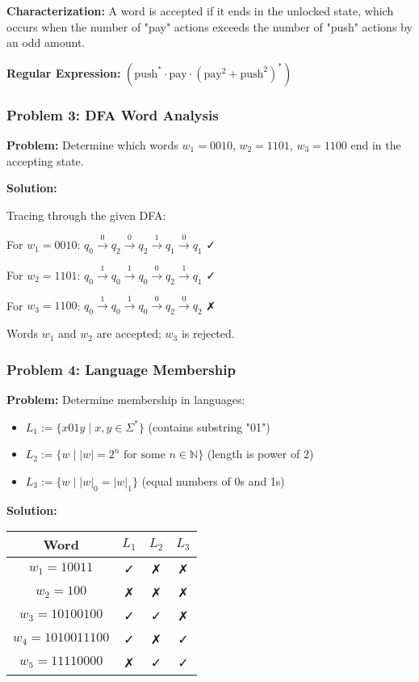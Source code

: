 \documentclass{article}
\begin{document}
\textbf{Characterization:} A word is accepted if it ends in the unlocked state, which occurs when the number of "pay" actions exceeds the number of "push" actions by an odd amount.

\textbf{Regular Expression:} $(\text{push}^* \cdot \text{pay} \cdot (\text{pay}^2 + \text{push}^2)^*)$

\subsubsection{Problem 3: DFA Word Analysis}

\textbf{Problem:} Determine which words $w_1 = 0010$, $w_2 = 1101$, $w_3 = 1100$ end in the accepting state.

\textbf{Solution:}

Tracing through the given DFA:

For $w_1 = 0010$: $q_0 \xrightarrow{0} q_2 \xrightarrow{0} q_2 \xrightarrow{1} q_1 \xrightarrow{0} q_1$ ✓

For $w_2 = 1101$: $q_0 \xrightarrow{1} q_0 \xrightarrow{1} q_0 \xrightarrow{0} q_2 \xrightarrow{1} q_1$ ✓

For $w_3 = 1100$: $q_0 \xrightarrow{1} q_0 \xrightarrow{1} q_0 \xrightarrow{0} q_2 \xrightarrow{0} q_2$ ✗

Words $w_1$ and $w_2$ are accepted; $w_3$ is rejected.

\subsubsection{Problem 4: Language Membership}

\textbf{Problem:} Determine membership in languages:
\begin{itemize}
    \item $L_1 := \{x01y \mid x, y \in \Sigma^*\}$ (contains substring "01")
    \item $L_2 := \{w \mid |w| = 2^n \text{ for some } n \in \mathbb{N}\}$ (length is power of 2)
    \item $L_3 := \{w \mid |w|_0 = |w|_1\}$ (equal numbers of 0s and 1s)
\end{itemize}

\textbf{Solution:}

\begin{center}
\begin{tabular}{|c|c|c|c|}
\hline
Word & $L_1$ & $L_2$ & $L_3$ \\
\hline
$w_1 = 10011$ & ✓ & ✗ & ✗ \\
$w_2 = 100$ & ✗ & ✗ & ✗ \\
$w_3 = 10100100$ & ✓ & ✓ & ✗ \\
$w_4 = 1010011100$ & ✓ & ✗ & ✓ \\
$w_5 = 11110000$ & ✗ & ✓ & ✓ \\
\hline
\end{tabular}
\end{center}
\end{document}
